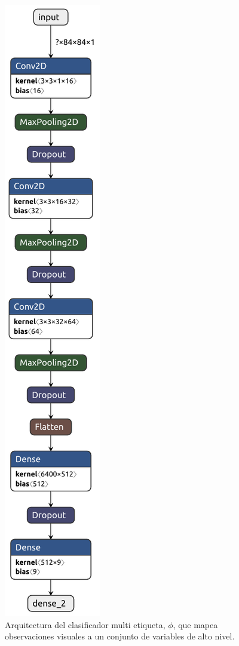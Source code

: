\begin{figure}[h]
    \includegraphics[scale=0.7]{Chapter5/Figs/multilabel_classifier.pdf}
    \caption{Arquitectura del clasificador multi etiqueta, $\phi$, que
    mapea observaciones visuales a un conjunto de variables
    de alto nivel.}
    \label{fig:cnn-classifier}
\end{figure}

